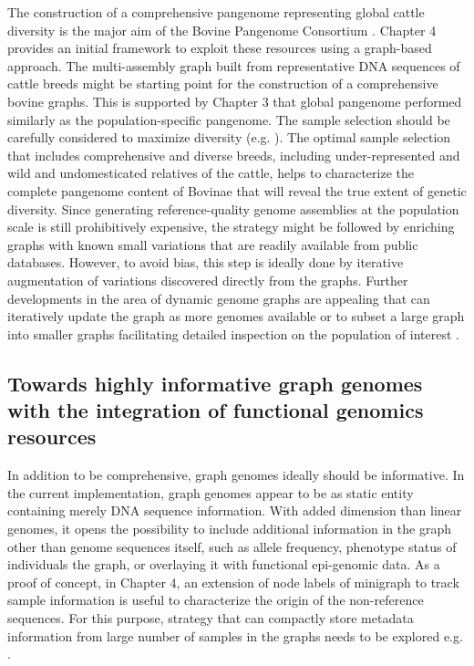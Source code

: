 \documentclass[../main.tex]{subfiles}
\begin{document}
The construction of a comprehensive pangenome representing  global cattle diversity is the major aim of the Bovine Pangenome Consortium \citep{heaton2021reference}. Chapter 4 provides an initial framework to exploit these resources using a graph-based approach. The multi-assembly graph built from representative DNA sequences of cattle breeds might be starting point for the construction of a comprehensive bovine graphs. This is supported by Chapter 3 that global pangenome performed similarly as the population-specific pangenome. The sample selection should be carefully considered to maximize diversity (e.g. \citep{Ros-Freixedes2017,ranallo2021optimized}). The optimal sample selection that includes comprehensive and diverse breeds, including under-represented and wild and undomesticated relatives of the cattle, helps to characterize the complete pangenome content of Bovinae that will reveal the true extent of genetic diversity. Since generating reference-quality genome assemblies at the population scale is still prohibitively expensive, the strategy might be followed by enriching graphs with known small variations that are readily available from public databases. However, to avoid bias, this step is ideally done by iterative augmentation of variations discovered directly from the graphs. Further developments in the area of dynamic genome graphs are appealing that can iteratively update the graph as more genomes available or to subset a large graph into smaller graphs facilitating detailed inspection on the population of interest \citep{eizenga2020efficient}.

\subsection*{Towards highly informative graph genomes with the integration of functional genomics resources}

In addition to be comprehensive, graph genomes ideally should be informative. In the current implementation, graph genomes appear to be as static entity containing merely DNA sequence information. With added dimension than linear genomes, it opens the possibility to include additional information in the graph other than genome sequences itself, such as allele frequency, phenotype status of individuals the graph, or overlaying it with functional epi-genomic data. As a proof of concept, in Chapter 4, an extension of node labels of minigraph to track sample information is useful to characterize the origin of the non-reference sequences. For this purpose, strategy that can compactly store metadata information from large number of samples in the graphs needs to be explored e.g. \citet{siren2020haplotype}. 
\end{document}
